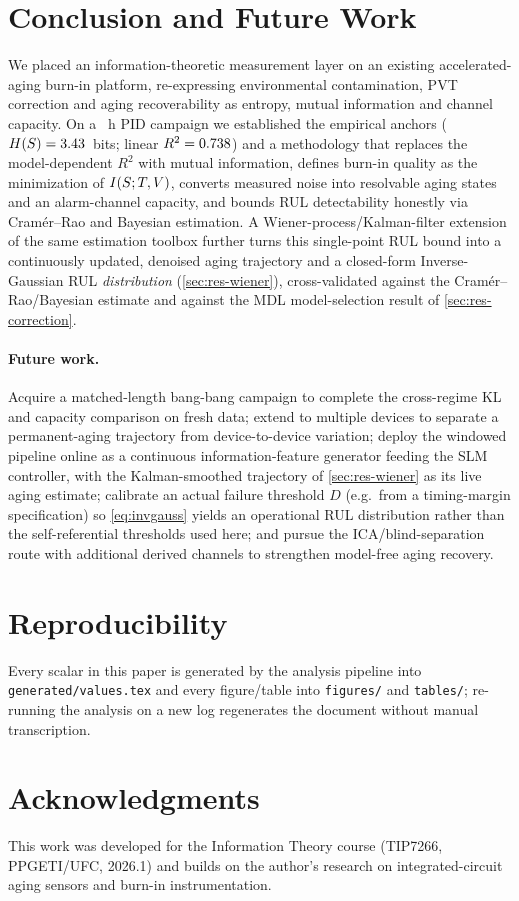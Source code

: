 \section{Conclusion and Future Work}
\label{sec:conclusion}

We placed an information-theoretic measurement layer on an existing accelerated-
aging burn-in platform, re-expressing environmental contamination, PVT
correction and aging recoverability as entropy, mutual information and channel
capacity. On a \valDurationHours~h PID campaign we established the empirical
anchors ($H\!\left(S\right)=3.43$~bits; linear $R^2=0.738$) and a methodology
that replaces the model-dependent $R^2$ with mutual information, defines burn-in
quality as the minimization of $I\!\left(S ; T,V\right)$, converts measured noise
into resolvable aging states and an alarm-channel capacity, and bounds RUL
detectability honestly via Cram\'er--Rao and Bayesian estimation. A
Wiener-process/Kalman-filter extension of the same estimation toolbox further
turns this single-point RUL bound into a continuously updated, denoised aging
trajectory and a closed-form Inverse-Gaussian RUL \emph{distribution}
(\cref{sec:res-wiener}), cross-validated against the Cram\'er--Rao/Bayesian
estimate and against the MDL model-selection result of \cref{sec:res-correction}.

\paragraph{Future work.} Acquire a matched-length bang-bang campaign to complete
the cross-regime KL and capacity comparison on fresh data; extend to multiple
devices to separate a permanent-aging trajectory from device-to-device
variation; deploy the windowed pipeline online as a continuous information-feature
generator feeding the SLM controller, with the Kalman-smoothed trajectory of
\cref{sec:res-wiener} as its live aging estimate; calibrate an actual failure
threshold $D$ (e.g.\ from a timing-margin specification) so
\cref{eq:invgauss} yields an operational RUL distribution rather than the
self-referential thresholds used here; and pursue the ICA/blind-separation
route with additional derived channels to strengthen model-free aging
recovery.

\section*{Reproducibility}
Every scalar in this paper is generated by the analysis pipeline into
\texttt{generated/values.tex} and every figure/table into \texttt{figures/} and
\texttt{tables/}; re-running the analysis on a new log regenerates the document
without manual transcription.

\section*{Acknowledgments}
This work was developed for the Information Theory course (TIP7266, PPGETI/UFC,
2026.1) and builds on the author's research on integrated-circuit aging sensors
and burn-in instrumentation.
